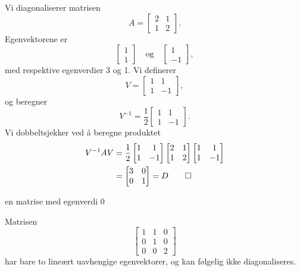 \begin{ex}	
Vi diagonaliserer matrisen 
\[
A=
\begin{bmatrix}
2     & 1 \\
1      & 2
\end{bmatrix}.
\]
Egenvektorene er 
\[
\begin{bmatrix}
1 \\ 1
\end{bmatrix}
\quad \text{og} \quad
\begin{bmatrix}
1 \\ -1
\end{bmatrix},
\]
med respektive egenverdier 3 og 1. Vi definerer
\[
V=
\begin{bmatrix}
1 & 1 \\ 1 &-1
\end{bmatrix},
\]
og beregner 
\[
V^{-1}=
\frac{1}{2}
\begin{bmatrix}
1 & 1 \\ 1 &-1
\end{bmatrix}.
\]
Vi dobbeltsjekker ved å beregne produktet
\begin{align*}
V^{-1}AV&=
\frac{1}{2}
\begin{bmatrix}
1 & 1 \\ 1 &-1
\end{bmatrix}
\begin{bmatrix}
2     & 1 \\
1      & 2
\end{bmatrix}
\begin{bmatrix}
1 & 1 \\ 1 &-1
\end{bmatrix}
\\& =
\begin{bmatrix}
3     & 0 \\
0      & 1
\end{bmatrix}
=
D \qedhere
\end{align*}
\end{ex}

\begin{ex}
en matrise med egenverdi 0
\end{ex}

\begin{ex}
Matrisen 
\[
\begin{bmatrix}
1 & 1 & 0\\  0 &1 & 0 \\ 0 & 0 & 2
\end{bmatrix}
\]
har bare to lineært uavhengige egenvektorer, og kan følgelig ikke diagonaliseres.
\end{ex}


